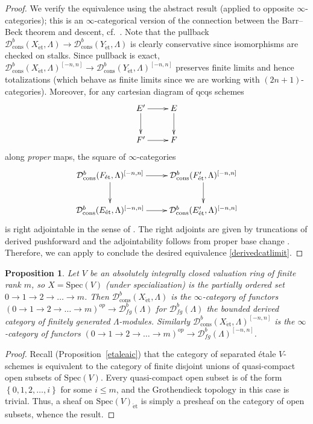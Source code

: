 \documentclass[reqno]{amsart}
\newcommand{\spec}{\mathrm{Spec}}
\newcommand{\et}{\mathrm{\acute{e}t}}
\newcommand{\D}{\mathcal{D}}
\newtheorem{proposition}[theorem]{Proposition}
\theoremstyle{definition}
\begin{document}
\begin{proof}
We verify the equivalence using the abstract result \cite[Cor.~4.7.5.3]{HA}
(applied to opposite $\infty$-categories); this is an $\infty$-categorical
version of the connection between the Barr--Beck theorem and descent,
cf.~\cite[Sec.~4.2]{Deligne90}. 
Note that the pullback 
$\D^b_{\mathrm{cons}}( X_{\et}, \Lambda) \to \D^b_{\mathrm{cons}}( Y_{\et}, \Lambda)$ is clearly conservative
since isomorphisms are checked on stalks. 
Since pullback is exact, 
$\D^b_{\mathrm{cons}}( X_{\et}, \Lambda)^{[-n, n]} \to \D^b_{\mathrm{cons}}( Y_{\et}, \Lambda)^{[-n, n]}$
preserves finite limits and hence totalizations (which behave as finite limits
since we are working with $(2n+1)$-categories). 
Moreover, for any cartesian diagram of qcqs schemes
\[ \xymatrix{
E' \ar[d] \ar[r] &  E \ar[d]  \\
F' \ar[r] &  F
}\]
along \emph{proper} maps,
the square
of $\infty$-categories
\[ \xymatrix{
\D^{b}_{\mathrm{cons}}( F_{\et}, \Lambda)^{[-n, n]} \ar[d]  \ar[r] &  \D^b_{\mathrm{cons}}( F'_{\et},
\Lambda)^{[-n, n]} \ar[d]  \\
\D^b_{\mathrm{cons}}( E_{\et}, \Lambda)^{[-n, n]} \ar[r] &  \D^b_{\mathrm{cons}}( E'_{\et}, \Lambda)^{[-n, n]}
}\]
is right adjointable 
in the sense of 
\cite[Def.~4.7.4.13]{HA}. The right adjoints are given by truncations of
derived pushforward and the adjointability follows from proper base change
\cite[Exp.~XII, Th.~5.1]{SGA4}. 
Therefore, 
we can apply 
\cite[Cor.~4.7.5.3]{HA} to conclude the desired equivalence
\eqref{derivedcatlimit}. 
\end{proof} 

\begin{proposition} 
Let $V$ be an absolutely integrally closed valuation ring of finite rank $m$, so $X = \spec(V)$ (under
specialization) is the
partially ordered set $0 \to 1 \to 2 \to \dots \to m$. 
Then $\D^b_{\mathrm{cons}}( X_{\et}, \Lambda)$ is the $\infty$-category of functors
$(0 \to 1 \to 2 \to \dots \to m)^{op} \to \D^b_{fg}( \Lambda)$ for $\D^b_{fg}( \Lambda)$
the bounded derived category of finitely generated $\Lambda$-modules.
Similarly 
$\D^b_{\mathrm{cons}}( X_{\et}, \Lambda)^{[-n, n]}$ is the $\infty$-category of functors
$( 0 \to 1 \to 2 \to \dots \to m)^{op} \to \D^b_{fg}( \Lambda)^{[-n, n]}$. 
\label{etalesheafonspec}
\end{proposition} 
\begin{proof} 
Recall (Proposition~\ref{etaleaic}) that the category of separated \'etale $V$-schemes is equivalent to the
category of finite disjoint unions of quasi-compact open subsets of $\spec(V)$. 
Every quasi-compact open subset is of the form
$\left\{0, 1, 2, \dots, i\right\}$ for some $i \leq m$, 
and 
the Grothendieck topology in this case is trivial. 
Thus, a sheaf 
on $\spec(V)_{\et}$
is simply a presheaf on the category
of open subsets, whence the result. 
\end{proof} 
\end{document}
